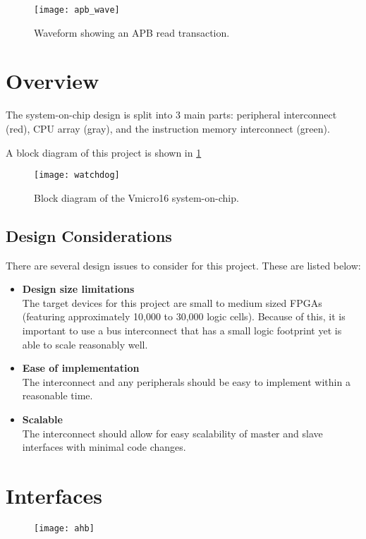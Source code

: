 \begin{figure}[H]
\centering
\texttt{[image: apb\_wave]}
\caption{Waveform showing an APB read transaction.}
\end{figure}

\section{Overview}
The system-on-chip design is split into 3 main parts: peripheral interconnect (red), CPU array (gray), and the instruction memory interconnect (green).

A block diagram of this project is shown in \cref{fig:watchdog}
\begin{figure}[H]
\centering
\texttt{[image: watchdog]}
\caption{Block diagram of the Vmicro16 system-on-chip.}
\label{fig:watchdog}
\end{figure}

\subsection{Design Considerations}
There are several design issues to consider for this project. These are listed below:

\begin{itemize}
\item \textbf{Design size limitations}\\
The target devices for this project are small to medium sized FPGAs (featuring approximately 10,000 to 30,000 logic cells). Because of this, it is important to use a bus interconnect that has a small logic footprint yet is able to scale reasonably well.

\item \textbf{Ease of implementation}\\
The interconnect and any peripherals should be easy to implement within a reasonable time.

\item \textbf{Scalable}\\
The interconnect should allow for easy scalability of master and slave interfaces with minimal code changes.
\end{itemize}

\section{Interfaces}

\begin{figure}[H]
\centering
\texttt{[image: ahb]}
\end{figure}


